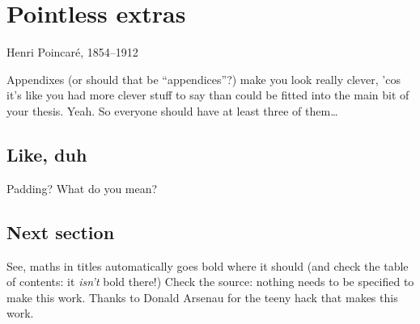 \chapter{Pointless extras}
\label{app:Pointless}

%
{Henri Poincar\'e, 1854--1912}

Appendixes (or should that be ``appendices''?) make you look really clever, 'cos
it's like you had more clever stuff to say than could be fitted into the main
bit of your thesis. Yeah. So everyone should have at least three of them\dots

\section{Like, duh}
\label{sec:Duh}
Padding? What do you mean?

\section{Next section}
\label{sec:EqnTitle}
See, maths in titles automatically goes bold where it should (and check the
table of contents: it \emph{isn't} bold there!) Check the source: nothing
needs to be specified to make this work. Thanks to Donald Arsenau for the
teeny hack that makes this work.
